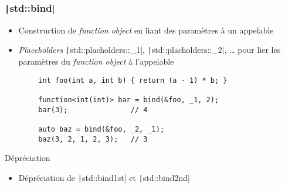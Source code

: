\documentclass[C++.tex]{subfiles}
\begin{document}
\begin{frame}[fragile]
	\frametitle{\texttt|std::bind|}
	\begin{itemize}
		\item Construction de \textit{function object} en liant des paramètres à un appelable
		\item \textit{Placeholders} \texttt|std::placholders::_1|, \texttt|std::placholders::_2|, \ldots{} pour lier les paramètres du \textit{function object} à l'appelable
	\end{itemize}

	\begin{verbatim}
		int foo(int a, int b) { return (a - 1) * b; }

		function<int(int)> bar = bind(&foo, _1, 2);
		bar(3);               // 4

		auto baz = bind(&foo, _2, _1);
		baz(3, 2, 1, 2, 3);   // 3
	\end{verbatim}


	\begin{block}{Dépréciation}
		\begin{itemize}
			\item Dépréciation de \texttt|std::bind1st| et \texttt|std::bind2nd|
		\end{itemize}

	\end{block}


\end{frame}
\end{document}
